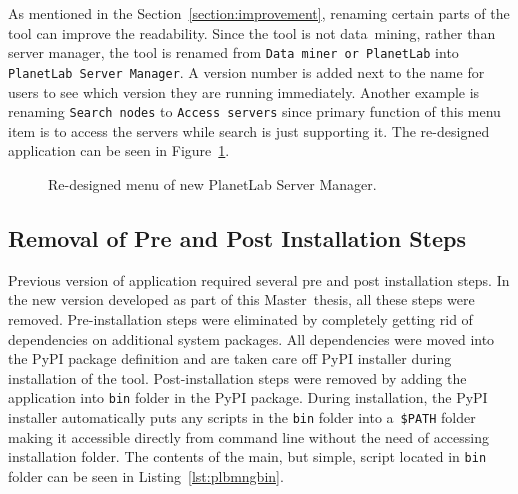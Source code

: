{{{{As mentioned in the Section~\ref{section:improvement}, renaming certain parts of the tool can improve the readability. Since the tool is not data~mining, rather than server manager, the tool is renamed from \texttt{Data~miner or PlanetLab} into \texttt{PlanetLab Server Manager}. A version number is added next to the name for users to see which version they are running immediately. Another example is renaming \texttt{Search nodes} to \texttt{Access servers} since primary function of this menu item is to access the servers while search is just supporting it. The re-designed application can be seen in Figure~\ref{fig:redesigned}.\\

\begin{figure}[H]
	\centering
	\caption{Re-designed menu of new PlanetLab Server Manager.}
	\label{fig:redesigned}
\end{figure}

\subsection{Removal of Pre and Post Installation Steps}
Previous version of application required several pre and post installation steps. In the new version developed as part of this Master~thesis, all these steps were removed. Pre-installation steps were eliminated by completely getting rid of dependencies on additional system packages. All dependencies were moved into the PyPI package definition and are taken care off PyPI installer during installation of the tool. Post-installation steps were removed by adding the application into \texttt{bin} folder in the PyPI package. During installation, the PyPI installer automatically puts any scripts in the \texttt{bin} folder into a~\texttt{\$PATH} folder making it accessible directly from command line without the need of accessing installation folder. The contents of the main, but simple, script located in \texttt{bin} folder can be seen in Listing~\ref{lst:plbmngbin}.

}}}}
